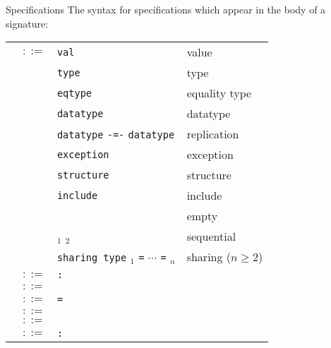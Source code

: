 \begin{grammar}{Specifications}
The syntax for specifications which appear in the body of a signature:
\begin{longtable}{rcll}
\label{grammar:spec}\nonterminal{spec} & $::=$ &
\texttt{val} \nonterminal{valdesc} & value\\
&\alt&\texttt{type} \nonterminal{typdesc} & type\\
&\alt&\texttt{eqtype} \nonterminal{typdesc} & equality type\\
&\alt&\texttt{datatype} \nonterminal{datdesc} & datatype\\
&\alt&\texttt{datatype} \nonterminal{tycon} \texttt{-=-}
\texttt{datatype} \nonterminal{longtycon} & replication\\
&\alt& \texttt{exception} \nonterminal{exdesc} & exception\\
&\alt& \texttt{structure} \nonterminal{strdesc} & structure\\
&\alt& \texttt{include} \nonterminal{sigexp} & include\\
&\alt& & empty\\
&\alt& \nonterminal{spec}$_{1}$ \optional{\texttt{;}} \nonterminal{spec}$_{2}$ & sequential\\
&\alt&\nonterminal{spec} \texttt{sharing type}
\nonterminal{longtycon}$_{1}$ \texttt{=} $\cdots$ \texttt{=} \nonterminal{longtycon}$_{n}$
& sharing ($n\geq2$)\\
\label{grammar:valdesc}\nonterminal{valdesc} & $::=$ &
\nonterminal{vid} \texttt{:} \nonterminal{ty} \optional{\texttt{and} \nonterminal{valdesc}} & \\
\label{grammar:typdesc}\nonterminal{typdesc} & $::=$ &
\nonterminal{tyvarseq} \nonterminal{tycon} \optional{\texttt{and} \nonterminal{typdesc}} & \\
\label{grammar:datdesc}\nonterminal{datdesc} & $::=$ & \nonterminal{tyvarseq} \nonterminal{tycon} \texttt{=} \nonterminal{condesc} \optional{\texttt{and} \nonterminal{datdesc}} & \\
\label{grammar:condesc}\nonterminal{condesc} & $::=$ & \nonterminal{vid} \optional{\texttt{of} \nonterminal{ty}} \optional{\texttt{\char`\|} \nonterminal{condesc}} & \\
\label{grammar:exdesc}\nonterminal{exdesc} & $::=$ & \nonterminal{vid} \optional{\texttt{of} \nonterminal{ty}}
\optional{\texttt{\char`\|} \nonterminal{exdesc}} & \\
\label{grammar:strdesc}\nonterminal{strdesc} & $::=$ & \nonterminal{strid} \texttt{:} \nonterminal{sigexp} \optional{\texttt{and} \nonterminal{strdesc}} & \\
\end{longtable}
\end{grammar}

